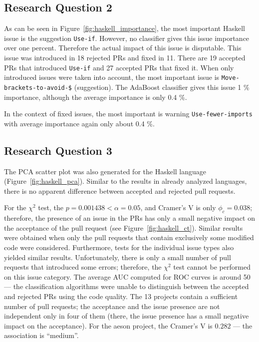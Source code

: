 \documentclass[digital,oneside,oldtable,nolof,nolot,nocover]{fithesis4}
\begin{document}
\subsection{Research Question 2}
\label{sec:org191c1a4}
As can be seen in Figure~\ref{fig:haskell_importance},
the most important Haskell issue is the suggestion \texttt{Use-if}.
However, no classifier gives this
issue importance over one percent. Therefore the actual impact of this issue is disputable.
This issue was introduced in 18 rejected PRs and fixed in 11. There are 19 accepted PRs that
introduced \texttt{Use-if} and 27 accepted PRs that fixed it.
When only introduced issues were taken into account, the most important
issue is \texttt{Move-brackets-to-avoid-\$} (suggestion). The AdaBoost classifier
gives this issue 1 \% importance, although the average importance is only 0.4 \%.

In the context of fixed issues, the most important is warning
\texttt{Use-fewer-imports} with average importance again only about 0.4 \%.
\subsection{Research Question 3}
\label{sec:org45bab01}
The PCA scatter plot was also generated for the Haskell language (Figure~\ref{fig:haskell_pca}).
Similar to the results in already analyzed languages, there is no apparent
difference between accepted and rejected pull requests.

For the \(\chi^2\) test, the \(p = 0.001438 < \alpha = 0.05\), and Cramer's V is only \(\phi_c = 0.038\);
therefore, the presence of an issue in the PRs has only a small negative impact on the
acceptance of the pull request (see Figure~\ref{fig:haskell_ct}). Similar results were obtained when only
the pull requests that contain exclusively some modified code were considered.
Furthermore, tests for the individual issue types also yielded similar results.
Unfortunately, there is only a small number of pull requests that introduced some errors;
therefore, the \(\chi^2\) test cannot be performed on this issue category.
The average AUC computed for ROC curves is around 50 --- the classification algorithms
were unable to distinguish between the accepted and rejected PRs using the code quality.
The 13 projects contain a sufficient number of pull requests; the acceptance and
the issue presence are not independent only in four of them (there, the issue presence
has a small negative impact on the acceptance). For the aeson project,
the Cramer's V is \(0.282\) --- the association is ``medium''.
\end{document}
